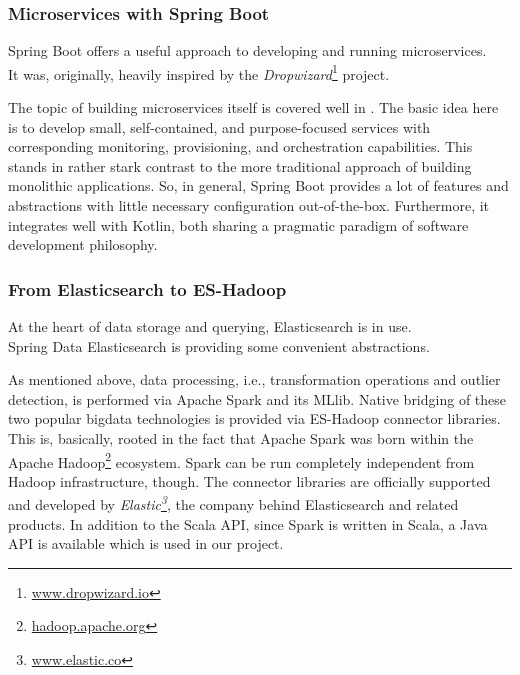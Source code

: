 \subsubsection{Microservices with Spring Boot}

Spring Boot offers a useful approach to developing and running microservices. \\
It was, originally, heavily inspired by the \emph{Dropwizard}\footnote{\textcolor{blue}{\href{http://www.dropwizard.io/}{www.dropwizard.io}}} project.

The topic of building microservices itself is covered well in \cite{Newman2015}.
The basic idea here is to develop small, self-contained, and purpose-focused services with corresponding monitoring, provisioning, and orchestration capabilities.
This stands in rather stark contrast to the more traditional approach of building monolithic applications.
So, in general, Spring Boot provides a lot of features and abstractions with little necessary configuration out-of-the-box.
Furthermore, it integrates well with Kotlin, both sharing a pragmatic paradigm of software development philosophy.

\subsubsection{From Elasticsearch to ES-Hadoop} \label{sec:es-hadoop}

At the heart of data storage and querying, Elasticsearch is in use. \\
Spring Data Elasticsearch is providing some convenient abstractions.

As mentioned above, data processing, i.e., transformation operations and outlier detection, is performed via Apache Spark and its MLlib.
Native bridging of these two popular \gls{bigdata} technologies is provided via ES-Hadoop connector libraries.
This is, basically, rooted in the fact that Apache Spark was born within the Apache Hadoop\footnote{\textcolor{blue}{\href{https://hadoop.apache.org/}{hadoop.apache.org}}} ecosystem.
Spark can be run completely independent from Hadoop infrastructure, though.
The connector libraries are officially supported and developed by \emph{Elastic\footnote{\textcolor{blue}{\href{https://www.elastic.co/}{www.elastic.co}}}}, the company behind Elasticsearch and related products.
In addition to the Scala \textsc{API}, since Spark is written in Scala, a Java \textsc{API} is available which is used in our project.


